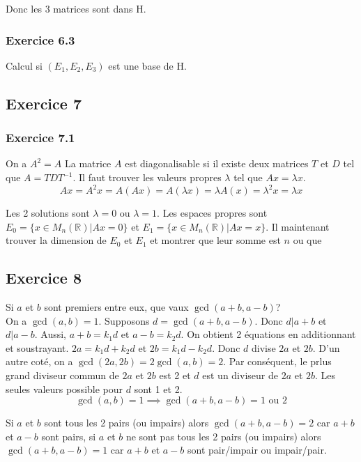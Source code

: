 \documentclass[]{book}
\theoremstyle{definition}
\newcommand{\bb}[1]{\mathbb{#1}}
\newcommand{\R}{\bb{R}}
\begin{document}
Donc les 3 matrices sont dans H.

\subsubsection*{Exercice 6.3}
Calcul si $(E_1, E_2, E_3)$ est une base de H. 

\subsection*{Exercice 7}
\subsubsection*{Exercice 7.1}
On a $A^2 = A$ La matrice $A$ est diagonalisable si il existe deux matrices $T$ et $D$ tel que $A=TDT^{-1}$. Il faut trouver les valeurs propres $\lambda$ tel que $Ax = \lambda x$.
$$
Ax = A^2x = A(Ax) = A(\lambda x) = \lambda A(x) = \lambda^2 x = \lambda x
$$

Les 2 solutions sont $\lambda = 0$ ou $\lambda = 1$. Les espaces propres sont $E_0 = \{x \in M_n(\R)|Ax = 0\}$ et $E_1 = \{x \in M_n(\R)|Ax = x\}$. Il maintenant trouver la dimension de $E_0$ et $E_1$ et montrer que leur somme est $n$ ou que 



\subsection*{Exercice 8}
Si $a$ et $b$ sont premiers entre eux, que vaux $\gcd(a+b, a-b)$?\\

On a $\gcd(a,b) = 1$. Supposons $d = \gcd(a+b, a-b)$. Donc $d | a+b$ et $d|a-b$. Aussi, $a+b = k_1d$ et $a-b = k_2d$. On obtient 2 \'equations en additionnant et soustrayant. $2a = k_1d+k_2d$ et $2b = k_1d-k_2d$. Donc $d$ divise $2a$ et $2b$. D'un autre cot\'e, on a $\gcd(2a,2b) = 2 \gcd(a,b) = 2$. Par cons\'equent, le prlus grand diviseur commun de $2a$ et $2b$ est 2 et $d$ est un diviseur de $2a$ et $2b$. Les seules valeurs possible pour $d$ sont 1 et 2.
$$\gcd(a,b) = 1 \implies \gcd(a+b, a-b) = 1 \text{ ou } 2$$

Si $a$ et $b$ sont tous les 2 pairs (ou impairs) alors $\gcd(a+b, a-b) = 2$ car $a+b$ et $a-b$ sont pairs, si $a$ et $b$ ne sont pas tous les 2 pairs (ou impairs) alors $\gcd(a+b, a-b) = 1$ car $a+b$ et $a-b$ sont pair/impair ou impair/pair.
\end{document}
